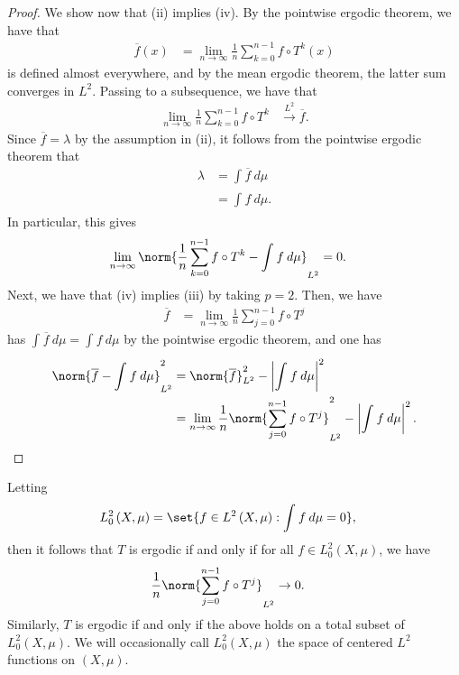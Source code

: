 \documentclass[10pt]{mypackage}
\begin{document}
\begin{proof}
  We show now that (ii) implies (iv). By the pointwise ergodic theorem, we have that
  \begin{align*}
    \overline{f}(x) &= \lim_{n\rightarrow\infty} \frac{1}{n}\sum_{k=0}^{n-1} f\circ T^{k}(x)
  \end{align*}
  is defined almost everywhere, and by the mean ergodic theorem, the latter sum converges in $L^2$. Passing to a subsequence, we have that 
  \begin{align*}
    \lim_{n\rightarrow\infty} \frac{1}{n}\sum_{k=0}^{n-1} f\circ T^{k} &\xrightarrow{L^2} \overline{f}.
  \end{align*}
  Since $ \overline{f} = \lambda $ by the assumption in (ii), it follows from the pointwise ergodic theorem that
  \begin{align*}
    \lambda &= \int_{}^{} \overline{f}\:d\mu\\
            &= \int_{}^{} f\:d\mu.
  \end{align*}
  In particular, this gives
  \begin{align*}
    \lim_{n\rightarrow\infty} \norm{\frac{1}{n}\sum_{k=0}^{n-1}f\circ T^{k} - \int_{}^{} f\:d\mu}_{L^2} &= 0.
  \end{align*}
  Next, we have that (iv) implies (iii) by taking $p = 2$. Then, we have
  \begin{align*}
    \overline{f} &= \lim_{n\rightarrow\infty} \frac{1}{n}\sum_{j=0}^{n-1}f\circ T^{j}
  \end{align*}
  has $ \int_{}^{} \overline{f}\:d\mu = \int_{}^{} f\:d\mu $ by the pointwise ergodic theorem, and one has
  \begin{align*}
    \norm{ \overline{f} - \int_{}^{} f\:d\mu }_{L^2}^2 &= \norm{ \overline{f} }_{L^2}^2 - \left\vert \int_{}^{} f\:d\mu \right\vert^2\\
                                                       &= \lim_{n\rightarrow\infty} \frac{1}{n}\norm{\sum_{j=0}^{n-1} f\circ T^{j}}_{L^2}^2 - \left\vert \int_{}^{} f\:d\mu \right\vert^2.
  \end{align*}
\end{proof}
\begin{remark}
  Letting
  \begin{align*}
    L^2_0\left( X,\mu \right) &= \set{f\in L^2\left( X,\mu \right) : \int_{}^{} f\:d\mu = 0},
  \end{align*}
  then it follows that $T$ is ergodic if and only if for all $f\in L^2_0\left( X,\mu \right)$, we have
  \begin{align*}
    \frac{1}{n}\norm{\sum_{j=0}^{n-1}f\circ T^{j}}_{L^2} &\to 0.
  \end{align*}
  Similarly, $T$ is ergodic if and only if the above holds on a total subset of $L^2_0\left( X,\mu \right)$. We will occasionally call $L^2_0\left( X,\mu \right)$ the space of centered $L^2$ functions on $\left( X,\mu \right)$.
\end{remark}
\end{document}
